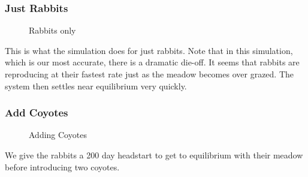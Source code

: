 \documentclass{article}
\begin{document}
\begin{normalsize}
\subsubsection{Just Rabbits}

\begin{figure}[H]
	\caption{Rabbits only}
\end{figure}

This is what the simulation does for just rabbits.  Note that in this simulation, which is our most accurate, there is a dramatic die-off.  It seems that rabbits are reproducing at their fastest rate just as the meadow becomes over grazed.  The system then settles near equilibrium very quickly.

\subsubsection{Add Coyotes}

\begin{figure}[H]
	\caption{Adding Coyotes}
\end{figure}

We give the rabbits a 200 day headstart to get to equilibrium with their meadow before introducing two coyotes.


\end{normalsize}
\end{document}
